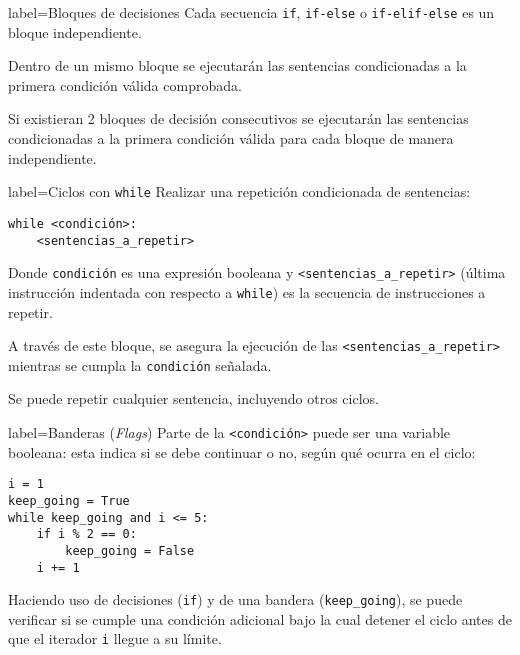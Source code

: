 \begin{contentbox}{label=Bloques de decisiones}
    Cada secuencia \lstinline!if!, \lstinline!if-else! o \lstinline!if-elif-else! es un bloque independiente.
    
    Dentro de un mismo bloque se ejecutarán las sentencias condicionadas a la primera condición válida comprobada.
    
    Si existieran 2 bloques de decisión consecutivos se ejecutarán las sentencias condicionadas a la primera condición válida para cada bloque de manera independiente.
\end{contentbox}

\begin{contentbox}{label=Ciclos con \texttt{while}}
    Realizar una repetición condicionada de sentencias: 
\begin{lstlisting}
while <condición>:
    <sentencias_a_repetir>
\end{lstlisting}

    Donde \lstinline!condición! es una \alert{expresión booleana} y \lstinline!<sentencias_a_repetir>! (última instrucción indentada con respecto a \lstinline!while!) es la secuencia de instrucciones a repetir.
    
    A través de este bloque, se asegura la ejecución de las \lstinline!<sentencias_a_repetir>! mientras se cumpla la \lstinline!condición! señalada.
    
    Se puede repetir cualquier sentencia, incluyendo otros ciclos.
\end{contentbox}

\begin{contentbox}{label=Banderas (\textit{Flags})}
    Parte de la \lstinline!<condición>! puede ser una variable booleana: esta indica si se debe continuar o no, según qué ocurra en el ciclo:
    
\begin{lstlisting}
i = 1
keep_going = True
while keep_going and i <= 5:
    if i % 2 == 0:
        keep_going = False
    i += 1
\end{lstlisting}

    Haciendo uso de decisiones (\lstinline!if!) y de una bandera (\lstinline!keep_going!), se puede verificar si se cumple una condición adicional bajo la cual detener el ciclo antes de que el iterador \lstinline!i! llegue a su límite.
\end{contentbox}

